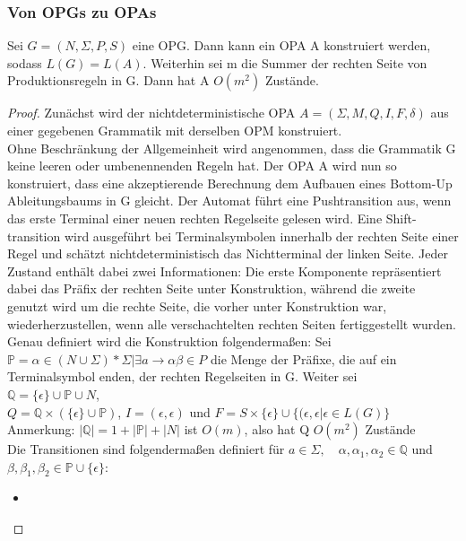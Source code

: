 \subsubsection{Von OPGs zu OPAs}
\begin{lemma}
Sei $G=(N,\Sigma, P, S)$ eine OPG. Dann kann ein OPA A konstruiert werden, sodass $L(G)=L(A)$. Weiterhin sei m die Summer der rechten Seite von Produktionsregeln in G. Dann hat A $O(m^2)$ Zustände.
\end{lemma}
\begin{proof}
Zunächst wird der nichtdeterministische OPA $A=(\Sigma, M, Q, I,F, \delta)$ aus einer gegebenen Grammatik mit derselben OPM konstruiert.\\
Ohne Beschränkung der Allgemeinheit wird angenommen, dass die Grammatik G keine leeren oder umbenennenden Regeln hat. Der OPA A wird nun so konstruiert, dass eine akzeptierende Berechnung dem Aufbauen eines Bottom-Up Ableitungsbaums in G gleicht. Der Automat führt eine Pushtransition aus, wenn das erste Terminal einer neuen rechten Regelseite gelesen wird. Eine Shift-transition  wird ausgeführt bei Terminalsymbolen innerhalb der rechten Seite einer Regel und schätzt nichtdeterministisch das Nichtterminal der linken Seite. Jeder Zustand enthält dabei zwei Informationen: Die erste Komponente repräsentiert dabei das Präfix der rechten Seite unter Konstruktion, während die zweite genutzt wird um die rechte Seite, die vorher unter Konstruktion war, wiederherzustellen, wenn alle verschachtelten rechten Seiten fertiggestellt wurden.\\
Genau definiert wird die Konstruktion folgendermaßen: Sei \\
\centering
$\mathbb{P}={\alpha\in (N\cup\Sigma)*\Sigma|\exists a\rightarrow\alpha\beta\in P}$
die Menge der Präfixe, die auf ein Terminalsymbol enden, der rechten Regelseiten in G. Weiter sei\\
\centering
$\mathbb{Q}=\{\epsilon\}\cup\mathbb{P}\cup N$,\\
$Q=\mathbb{Q} \times (\{\epsilon\} \cup \mathbb{P})$, $I={(\epsilon, \epsilon)}$ und $F=S\times \{\epsilon\} \cup \{(\epsilon, \epsilon|\epsilon\in L(G)\}$
Anmerkung: $|\mathbb{Q}|=1+|\mathbb{P}|+|N|$ ist $O(m)$, also hat Q $O(m^2)$ Zustände\\
Die Transitionen sind folgendermaßen definiert für $a\in \Sigma, \quad \alpha, \alpha_1, \alpha_2\in\mathbb{Q}$ und $\beta, \beta_1, \beta_2 \in \mathbb{P} \cup \{\epsilon\}$:
\begin{itemize}
\item

\end{itemize}
\end{proof}
